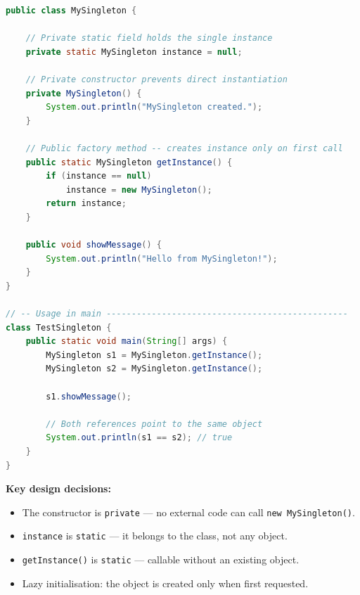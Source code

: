 \documentclass[12pt,a3paper]{article}
\begin{document}
\begin{enumerate}
\begin{tcolorbox}[enhanced,breakable,ansbox,
  colback=cB!4,colframe=cB,boxrule=0.8pt,arc=5pt,
  title={\textbf{Answer --- \texttt{MySingleton}: Singleton Pattern}},
  fonttitle=\bfseries\color{white},colbacktitle=cB]

\begin{lstlisting}[language=Java]
public class MySingleton {

    // Private static field holds the single instance
    private static MySingleton instance = null;

    // Private constructor prevents direct instantiation
    private MySingleton() {
        System.out.println("MySingleton created.");
    }

    // Public factory method -- creates instance only on first call
    public static MySingleton getInstance() {
        if (instance == null)
            instance = new MySingleton();
        return instance;
    }

    public void showMessage() {
        System.out.println("Hello from MySingleton!");
    }
}

// -- Usage in main ------------------------------------------------
class TestSingleton {
    public static void main(String[] args) {
        MySingleton s1 = MySingleton.getInstance();
        MySingleton s2 = MySingleton.getInstance();

        s1.showMessage();

        // Both references point to the same object
        System.out.println(s1 == s2); // true
    }
}
\end{lstlisting}

\textbf{Key design decisions:}
\begin{itemize}[itemsep=2pt]
  \item The constructor is \texttt{private} --- no external code can
    call \texttt{new MySingleton()}.
  \item \texttt{instance} is \texttt{static} --- it belongs to the
    class, not any object.
  \item \texttt{getInstance()} is \texttt{static} --- callable without
    an existing object.
  \item Lazy initialisation: the object is created only when first
    requested.
\end{itemize}

\end{tcolorbox}



\end{enumerate}
\end{document}
